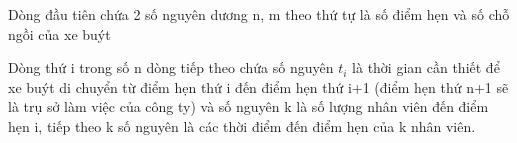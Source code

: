 Dòng đầu tiên chứa 2 số nguyên dương n, m theo thứ tự là số điểm hẹn và số chỗ ngồi của xe buýt  

   Dòng thứ i trong số n dòng tiếp theo chứa số nguyên $t_{i}$   là thời gian cần thiết để xe buýt di chuyển từ điểm hẹn thứ i đến điểm hẹn thứ   i+1 (điểm hẹn thứ n+1 sẽ là trụ sở làm việc của công ty) và số nguyên k là số lượng nhân viên đến điểm hẹn i, tiếp theo k số nguyên là các thời điểm đến   điểm hẹn của k nhân viên.